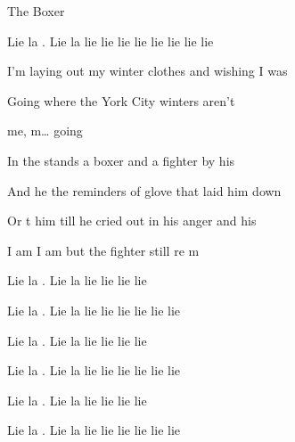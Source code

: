 \begin{SBSong}{The Boxer}
\begin{SBChorus}
    Lie la . Lie la  lie lie lie lie lie lie lie lie  
  \end{SBChorus}
  \CBPageBrk
  \begin{SBVerse}
     I'm laying out my winter clothes and wishing I was  
    
    Going  where the  York City winters aren't 
    
     me,  m\ldots{} going   
  \end{SBVerse}
  \begin{SBVerse}
    In the  stands a boxer and a fighter by his  
    
    And he  the reminders of  glove that laid him down 
    
    Or t him till he cried out in his anger and his  
    
    I am  I am  but the fighter still re m  
  \end{SBVerse}
  \begin{SBChorus}
    Lie la . Lie la  lie lie lie lie
    
    Lie la . Lie la  lie lie lie lie lie lie 
    
    Lie la . Lie la  lie lie lie lie
    
    Lie la . Lie la  lie lie lie lie lie lie
    
    Lie la . Lie la  lie lie lie lie
    
    Lie la . Lie la  lie lie lie lie lie lie 
  \end{SBChorus}
\end{SBSong}
